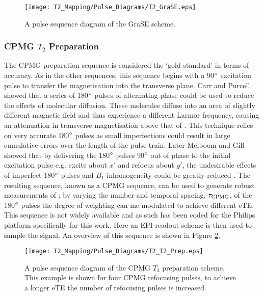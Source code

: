 \begin{figure}[H]
	\centering
	\texttt{[image: T2\_Mapping/Pulse\_Diagrams/T2\_GraSE.eps]}
	\caption{A pulse sequence diagram of the \ac{GraSE} scheme.}
	\label{fig:t2_grase_seq}	
\end{figure}

\newpage
\subsubsection{CPMG $T_2$ Preparation}

The \ac{CPMG} \ttwo preparation sequence is considered the `gold standard' in terms of accuracy. As in the other sequences, this sequence begins with a 90$\degree$ excitation pulse to transfer the magnetisation into the transverse plane. Carr and Purcell showed that a series of 180$\degree$ pulses of alternating phase could be used to reduce the effects of molecular diffusion. These molecules diffuse into an area of slightly different magnetic field and thus experience a different Larmor frequency, causing an attenuation in transverse magnetisation above that of \ttwo \cite{carr_effects_1954}. This technique relies on very accurate 180$\degree$ pulses as small imperfections could result in large cumulative errors over the length of the pulse train. Later Meiboom and Gill showed that by delivering the 180$\degree$ pulses 90$\degree$ out of phase to the initial excitation pulse e.g. excite about $x'$ and refocus about $y'$, the undesirable effects of imperfect 180$\degree$ pulses and $B_1$ inhomogeneity could be greatly reduced \cite{meiboom_modified_1958}. The resulting sequence, known as a \acf{CPMG} sequence, can be used to generate robust measurements of \ttwo; by varying the number and temporal spacing, $\tau_{\textup{CPMG}}$, of the 180$\degree$ pulses the degree of \ttwo weighting can me modulated to achieve different \ac{eTE}. This sequence is not widely available and as such has been coded for the Philips platform specifically for this work. Here an \ac{EPI} readout scheme is then used to sample the signal. An overview of this sequence is shown in Figure \ref{fig:t2_cpmg_t2prep_seq}.

\begin{figure}[H]
	\centering
	\texttt{[image: T2\_Mapping/Pulse\_Diagrams/T2\_T2\_Prep.eps]}
	\caption{A pulse sequence diagram of the \ac{CPMG} $T_2$ preparation scheme. This example is shown for four \ac{CPMG} refocusing pulses, to achieve a longer \ac{eTE} the number of refocusing pulses is increased.}
	\label{fig:t2_cpmg_t2prep_seq}	
\end{figure}

